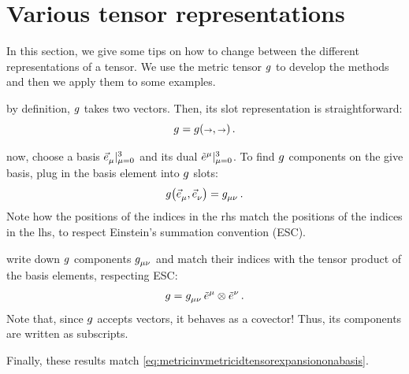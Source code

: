 
\section{Various tensor representations}\label{sec:varioustensorrepresentations}
%
In this section, we give some tips on how to change between the different representations of a tensor. We use the metric tensor $g$ to develop the methods and then we apply them to some examples.

 by definition, $g$ takes two vectors. Then, its slot representation is straightforward: 
%
\begin{equation*}
  \metric = \metric\vat{\vslot,\vslot}\,.
\end{equation*}

 now, choose a basis $\bset{\tbvec\mu}{\mu = 0}{3}$ and its dual $\bset{\tbcov\mu}{\mu = 0}{3}$. To find $g$ components on the give basis, plug in the basis element into $g$ slots:
%
\begin{equation*}
  \metric\vat{\tbvec\mu,\tbvec\nu} = \tmetric\mu\nu\,.
\end{equation*}
%
Note how the positions of the indices in the rhs match the positions of the indices in the lhs, to respect Einstein's summation convention (ESC).

 write down $g$ components $\tmetric\mu\nu$ and match their indices with the tensor product of the basis elements, respecting ESC:
%
\begin{equation*}
  \metric = \tmetric\mu\nu\,\tbcov\mu\tprod\tbcov\nu\,.
\end{equation*}
%
Note that, since $g$ accepts vectors, it behaves as a covector! Thus, its components are written as subscripts.

Finally, these results match \cref{eq:metricinvmetricidtensorexpansiononabasis}.

